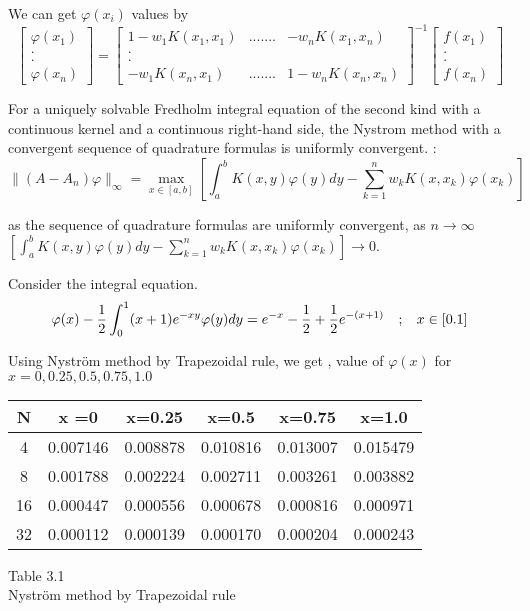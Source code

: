 \documentclass[../document.tex]{subfiles}
\begin{document}
We can get $\varphi(x_i)$ values  by 
$$
\begin{bmatrix}
	\varphi(x_1) \\
	.\\.\\
	\varphi(x_n) 
\end{bmatrix}
=
\begin{bmatrix}
	1 -w_1 K(x_1,x_1) &   ....... & -w_n K(x_1,x_n) \\
	.\\.\\
	-w_1 K(x_n,x_1)   &   ....... & 1-w_n K(x_n,x_n) 
\end{bmatrix}^{-1}
\begin{bmatrix}
	f(x_1) \\
	.\\.\\
	f(x_n)
\end{bmatrix}
$$
\begin{theorem}
	For a uniquely solvable Fredholm integral equation of the second kind with a continuous kernel and a continuous right-hand side, the Nystrom method with a convergent sequence of quadrature formulas is uniformly convergent. \newline
	\proofname:
	$$\|(A - A_n)\varphi\|_{\infty} =
	\max_{x \in [a,b]}
	\left[
	\int_a^b K(x,y)\varphi(y)dy - \sum_{k=1}^{n} w_k K(x,x_k)\varphi(x_k)
	\right]
	$$
	
	as the sequence of quadrature formulas are uniformly convergent, as $n \rightarrow \infty$
	$ 
	\left[
	\int_a^b K(x,y)\varphi(y)dy - \sum_{k=1}^{n} w_k K(x,x_k)\varphi(x_k)
	\right] \rightarrow 0 .
	$
\end{theorem}
	
  Consider the integral equation.
$$
\varphi(x) -
\frac{1}{2} \int_0^1 (x+1)e^{-xy} \varphi(y) dy =
e^{-x} -\frac{1}{2} + \frac{1}{2} e^{-(x+1)}
\quad \textsc{;} \quad x\in [0.1]
$$

Using Nyström method by Trapezoidal rule, we get ,
value of $\varphi(x)$ for $x = 0 , 0.25 , 0.5 ,0.75 ,1.0$
\begin{center}
	\begin{tabular}{| c | c | c | c | c | c |}
		\hline
		N & x =0 & x=0.25 & x=0.5 & x=0.75 & x=1.0\\
		\hline \hline
		4 & 0.007146 & 0.008878 & 0.010816 & 0.013007 & 0.015479 \\
		8 & 0.001788 & 0.002224 & 0.002711 & 0.003261 & 0.003882 \\
		16 & 0.000447 & 0.000556 & 0.000678 & 0.000816 & 0.000971 \\
		32 & 0.000112 & 0.000139 & 0.000170 & 0.000204 & 0.000243 \\
		\hline
	\end{tabular}
	\begin{center}
	Table 3.1\\
	Nyström method by Trapezoidal rule
	\end{center}
\end{center}
	
	
\end{document}
